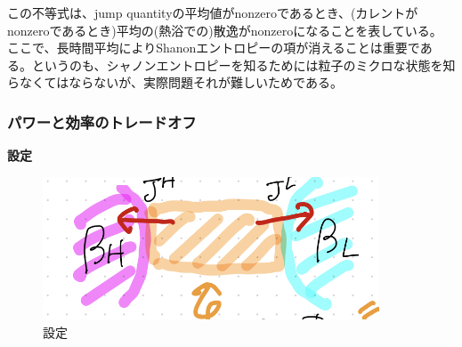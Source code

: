 \documentclass[a4paper,11pt]{jsarticle}
\numberwithin{equation}{section}
\begin{document}
この不等式は、jump quantityの平均値がnonzeroであるとき、(カレントがnonzeroであるとき)平均の(熱浴での)散逸がnonzeroになることを表している。\\
ここで、長時間平均によりShanonエントロピーの項が消えることは重要である。というのも、シャノンエントロピーを知るためには粒子のミクロな状態を知らなくてはならないが、実際問題それが難しいためである。

\subsubsection{パワーと効率のトレードオフ}
\textbf{設定}\\
\begin{figure}[H]
    \begin{center}
    \includegraphics[width=100mm]{set.png}
    \end{center}
    \caption{設定}
    \label{fig:set}
\end{figure}
\end{document}
